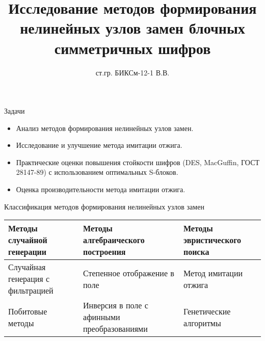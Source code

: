 \documentclass[12pt,unicode]{beamer}
\title{Исследование методов формирования нелинейных узлов замен блочных симметричных шифров}
\author{ст.гр. БИКСм-12-1 \newlineФролов В.В.}
\begin{document}
\def\ministry{Министерство образования и науки Украины}
\def\done{Выполнил}
\def\whochiefed{Руководитель}
\def\chief{д.т.н., проф. Кузнецов А.А.}
\date{}

\frame{\titlepage} 


\begin{frame}{Задачи}

    \begin{itemize}

        \item Анализ методов формирования нелинейных узлов замен.

        \item Исследование и улучшение метода имитации отжига.

        \item Практические оценки повышения стойкости шифров (DES, MacGuffin,
        ГОСТ 28147-89) с использованием оптимальных S-блоков.

        \item Оценка производительности метода имитации отжига.

    \end{itemize}

\end{frame} 


\begin{frame}{Классификация методов формирования нелинейных узлов замен}

    \begin{table}
        \def\arraystretch{1.5}
        \begin{tabular}{ L{3cm} | L{3.6cm} | L{3.3cm} }
            \bf Методы случайной генерации  & \bf Методы алгебраического построения & \bf Методы эвристического поиска \\ \hline\hline
            Случайная генерация с фильтрацией & Степенное отображение в поле & Метод имитации отжига \\ \hline
            Побитовые методы & Инверсия в поле с афинными преобразованиями & Генетические алгоритмы \\
        \end{tabular}
    \end{table}

\end{frame} 
\end{document}
